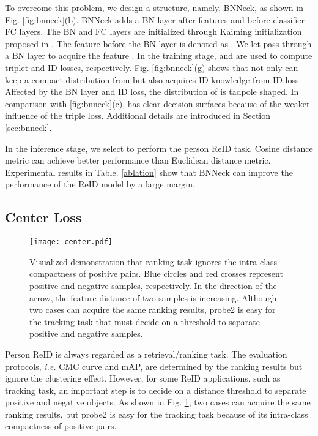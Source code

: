 \documentclass[journal]{IEEEtran}
\begin{document}
To overcome this problem, we design a structure, namely, BNNeck, as shown in Fig. \ref{fig:bnneck}(b).
BNNeck adds a BN layer after features and before classifier FC layers. The BN and FC layers are initialized through Kaiming initialization proposed in \cite{he2015delving}.
The feature before the BN layer is denoted as . We let  pass through a BN layer to acquire the feature . In the training stage,  and  are used to compute triplet and ID losses, respectively.
Fig. \ref{fig:bnneck}(g) shows that  not only can keep a compact distribution from but also acquires ID knowledge from ID loss.
Affected by the BN layer and ID loss, the distribution of  is tadpole shaped.
In comparison with \ref{fig:bnneck}(c),  has clear decision surfaces because of the weaker influence of the triple loss.
Additional details are introduced in Section \ref{sec:bnneck}.

In the inference stage, we select  to perform the person ReID task. Cosine distance metric can achieve better performance than Euclidean distance metric. Experimental results in Table. \ref{ablation} show that BNNeck can improve the performance of the ReID model by a large margin.


\subsection{Center Loss}
\begin{figure}[htb]
\centering
\vspace{-3mm}
\texttt{[image: center.pdf]}
\vspace{-7mm}
\caption{Visualized demonstration that ranking task ignores the intra-class compactness of positive pairs. Blue circles and red crosses represent positive and negative samples, respectively. In the direction of the arrow, the feature distance of two samples is increasing. Although two cases can acquire the same ranking results, probe2 is easy for the tracking task that must decide on a threshold to separate positive and negative samples.}
\label{fig:center}
\end{figure}

Person ReID is always regarded as a retrieval/ranking task.
The evaluation protocols, \emph{i.e.} CMC curve and mAP, are determined by the ranking results but ignore the clustering effect.
However, for some ReID applications, such as tracking task, an important step is to decide on a distance threshold to separate positive and negative objects. As shown in Fig. \ref{fig:center}, two cases can acquire the same ranking results, but probe2 is easy for the tracking task because of its intra-class compactness of positive pairs.
\end{document}
